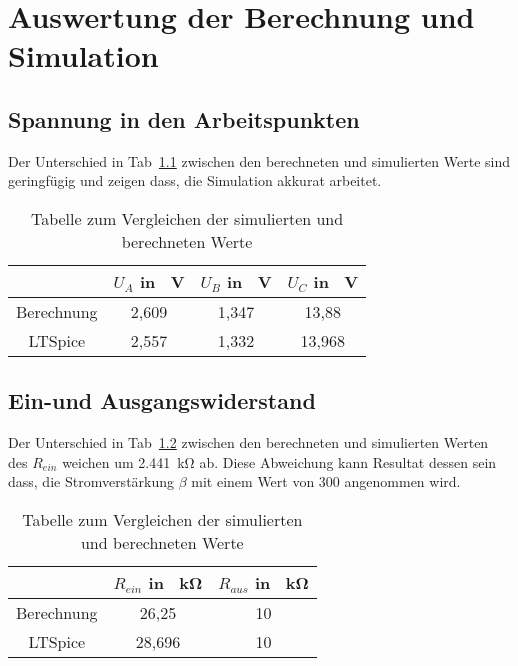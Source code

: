 \chapter{Auswertung der Berechnung und Simulation}
    \section{Spannung in den Arbeitspunkten}
        Der Unterschied in Tab~\ref{tab:arbeit} zwischen den berechneten und simulierten Werte sind geringfügig und zeigen dass, die Simulation akkurat arbeitet. 
        \begin{table}[h!]
            \centering
            \caption{Tabelle zum Vergleichen der simulierten und berechneten Werte}
            \begin{tabular}{| c | c | c | c |} 
                \hline
                & \(U_A\) in \SI{}{\V} & \(U_B\) in \SI{}{\V}  & \(U_C\) in \SI{}{\V}  \\
                \hline
                Berechnung & 2,609 & 1,347 & 13,88 \\ 
                \hline
                LTSpice & 2,557 & 1,332 & 13,968 \\
                \hline
            \end{tabular}
            \label{tab:arbeit}
        \end{table}
    \section{Ein-und Ausgangswiderstand}
        Der Unterschied in Tab~\ref{tab:widerstand} zwischen den berechneten und simulierten Werten des \(R_{ein}\) weichen um \SI{2.441}{\kilo\ohm} ab. Diese Abweichung kann Resultat dessen sein dass, die Stromverstärkung \(\beta\) mit einem Wert von 300 angenommen wird.
                \begin{table}[h!]
            \centering
            \caption{Tabelle zum Vergleichen der simulierten und berechneten Werte}
            \begin{tabular}{| c | c | c |} 
                \hline
                & \(R_{ein}\) in \SI{}{\kilo\ohm} & \(R_{aus}\) in \SI{}{\kilo\ohm}    \\
                \hline
                Berechnung & 26,25 & 10 \\ 
                \hline
                LTSpice & 28,696 & 10  \\
                \hline
            \end{tabular}
            \label{tab:widerstand}
        \end{table}

